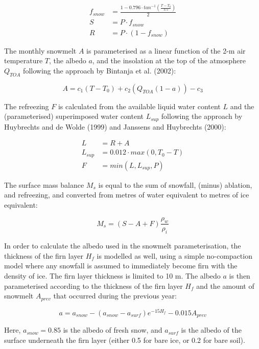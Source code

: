 \documentclass{article}
\begin{document}
\begin{align}
f_{snow} &= \frac{1 - 0.796 \cdot tan^{-1} \left( \frac{T - T_0}{3.5}\right) }{2} \\
S &= P \cdot f_{snow} \\
R &= P \cdot (1 - f_{snow})
\end{align}

The monthly snowmelt $A$ is parameterised as a linear function of the 2-m air temperature $T$, the albedo $a$, and the insolation at the top of the atmosphere $Q_{TOA}$ following the approach by Bintanja et al. (2002):

\begin{equation}
A = c_1 (T - T_0) + c_2 (Q_{TOA} (1 - a)) - c_3
\end{equation}

The refreezing $F$ is calculated from the available liquid water content $L$ and the (parameterised) superimposed water content $L_{sup}$ following the approach by Huybrechts and de Wolde (1999) and Janssens and Huybrechts (2000):

\begin{align}
L &= R + A \\
L_{sup} &= 0.012 \cdot max(0, T_0 - T) \\
F &= min( L, L_{sup}, P)
\end{align}

The surface mass balance $M_s$ is equal to the sum of snowfall, (minus) ablation, and refreezing, and converted from metres of water equivalent to metres of ice equivalent:

\begin{equation}
M_s = (S - A + F) \frac{\rho_w}{\rho_i}
\end{equation}

In order to calculate the albedo used in the snowmelt parameterisation, the thickness of the firn layer $H_f$ is modelled as well, using a simple no-compaction model where any snowfall is assumed to immediately become firn with the density of ice. The firn layer thickness is limited to 10 m. The albedo $a$ is then parameterised according to the thickness of the firn layer $H_f$ and the amount of snowmelt $A_{prev}$ that occurred during the previous year:

\begin{equation}
a = a_{snow} - (a_{snow} - a_{surf}) e^{-15 H_f} - 0.015 A_{prev}
\end{equation}

Here, $a_{snow} = 0.85$ is the albedo of fresh snow, and $a_{surf}$ is the albedo of the surface underneath the firn layer (either 0.5 for bare ice, or 0.2 for bare soil).
\end{document}

